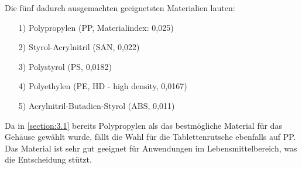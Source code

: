 Die fünf dadurch ausgemachten geeignetsten Materialien lauten:
\begin{itemize}
	\item[1)] Polypropylen (PP, Materialindex: 0,025)
	\item[2)] Styrol-Acrylnitril (SAN, 0,022) 
	\item[3)] Polystyrol (PS, 0,0182)
	\item[4)] Polyethylen (PE, HD - high density, 0,0167)
	\item[5)] Acrylnitril-Butadien-Styrol (ABS, 0,011)
\end{itemize}
Da in \ref{section:3.1} bereits Polypropylen als das bestmögliche Material für das Gehäuse gewählt wurde, fällt die Wahl für die Tablettenrutsche ebenfalls auf PP. Das Material ist sehr gut geeignet für Anwendungen im Lebensmittelbereich, was die Entscheidung stützt.

